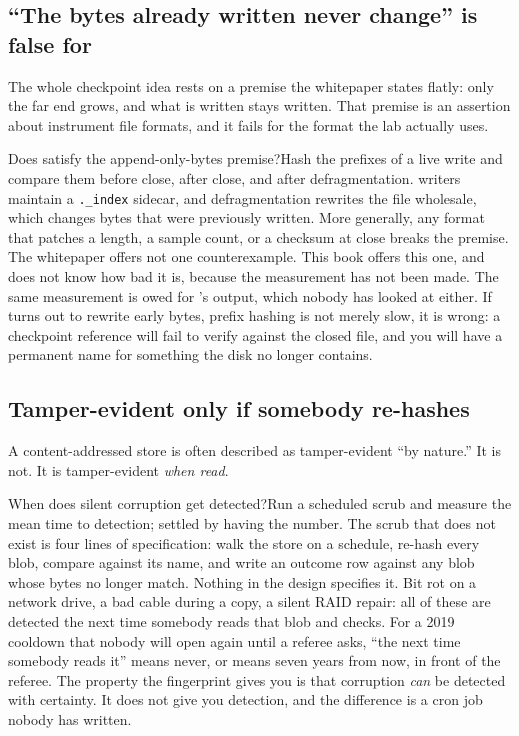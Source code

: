 \subsection{``The bytes already written never change'' is false for \labFileFormat}

The whole checkpoint idea rests on a premise the whitepaper states flatly: only the far end grows, and what is written stays written. That premise is an assertion about instrument file formats, and it fails for the format the lab actually uses.

\begin{Open}{Does \labFileFormat{} satisfy the append-only-bytes premise?}{Hash the prefixes of a live \labDAQ{} write and compare them before close, after close, and after defragmentation.}
\labDAQ{} writers maintain a \texttt{.\labFileExt\_index} sidecar, and \labFileFormat{} defragmentation rewrites the file wholesale, which changes bytes that were previously written. More generally, any format that patches a length, a sample count, or a checksum at close breaks the premise. The whitepaper offers not one counterexample. This book offers this one, and does not know how bad it is, because the measurement has not been made. The same measurement is owed for \labInstrument's output, which nobody has looked at either. If \labFileFormat{} turns out to rewrite early bytes, prefix hashing is not merely slow, it is wrong: a checkpoint reference will fail to verify against the closed file, and you will have a permanent name for something the disk no longer contains.
\end{Open}

\subsection{Tamper-evident only if somebody re-hashes}

A content-addressed store is often described as tamper-evident ``by nature.'' It is not. It is tamper-evident \emph{when read}.

\begin{Open}{When does silent corruption get detected?}{Run a scheduled scrub and measure the mean time to detection; settled by having the number.}
The scrub that does not exist is four lines of specification: walk the store on a schedule, re-hash every blob, compare against its name, and write an outcome row against any blob whose bytes no longer match. Nothing in the design specifies it. Bit rot on a network drive, a bad cable during a copy, a silent RAID repair: all of these are detected the next time somebody reads that blob and checks. For a 2019 cooldown that nobody will open again until a referee asks, ``the next time somebody reads it'' means never, or means seven years from now, in front of the referee. The property the fingerprint gives you is that corruption \emph{can} be detected with certainty. It does not give you detection, and the difference is a cron job nobody has written.
\end{Open}

